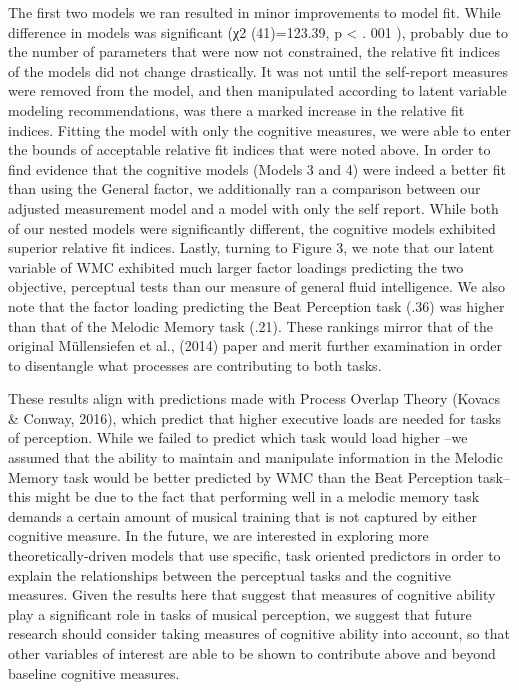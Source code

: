 \documentclass[]{book}
\theoremstyle{definition}
\theoremstyle{definition}
\theoremstyle{definition}
\theoremstyle{remark}
\begin{document}
The first two models we ran resulted in minor improvements to model fit.
While difference in models was significant (χ2 (41)=123.39, p
\textless{} . 001 ), probably due to the number of parameters that were
now not constrained, the relative fit indices of the models did not
change drastically. It was not until the self-report measures were
removed from the model, and then manipulated according to latent
variable modeling recommendations, was there a marked increase in the
relative fit indices. Fitting the model with only the cognitive
measures, we were able to enter the bounds of acceptable relative fit
indices that were noted above. In order to find evidence that the
cognitive models (Models 3 and 4) were indeed a better fit than using
the General factor, we additionally ran a comparison between our
adjusted measurement model and a model with only the self report. While
both of our nested models were significantly different, the cognitive
models exhibited superior relative fit indices. Lastly, turning to
Figure 3, we note that our latent variable of WMC exhibited much larger
factor loadings predicting the two objective, perceptual tests than our
measure of general fluid intelligence. We also note that the factor
loading predicting the Beat Perception task (.36) was higher than that
of the Melodic Memory task (.21). These rankings mirror that of the
original Müllensiefen et al., (2014) paper and merit further examination
in order to disentangle what processes are contributing to both tasks.

These results align with predictions made with Process Overlap Theory
(Kovacs \& Conway, 2016), which predict that higher executive loads are
needed for tasks of perception. While we failed to predict which task
would load higher --we assumed that the ability to maintain and
manipulate information in the Melodic Memory task would be better
predicted by WMC than the Beat Perception task-- this might be due to
the fact that performing well in a melodic memory task demands a certain
amount of musical training that is not captured by either cognitive
measure. In the future, we are interested in exploring more
theoretically-driven models that use specific, task oriented predictors
in order to explain the relationships between the perceptual tasks and
the cognitive measures. Given the results here that suggest that
measures of cognitive ability play a significant role in tasks of
musical perception, we suggest that future research should consider
taking measures of cognitive ability into account, so that other
variables of interest are able to be shown to contribute above and
beyond baseline cognitive measures.
\end{document}
